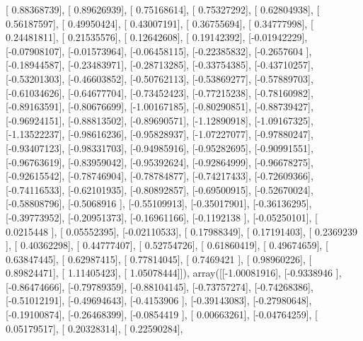 \documentclass{article}
\begin{document}
       [ 0.88368739],
       [ 0.89626939],
       [ 0.75168614],
       [ 0.75327292],
       [ 0.62804938],
       [ 0.56187597],
       [ 0.49950424],
       [ 0.43007191],
       [ 0.36755694],
       [ 0.34777998],
       [ 0.24481811],
       [ 0.21535576],
       [ 0.12642608],
       [ 0.19142392],
       [-0.01942229],
       [-0.07908107],
       [-0.01573964],
       [-0.06458115],
       [-0.22385832],
       [-0.2657604 ],
       [-0.18944587],
       [-0.23483971],
       [-0.28713285],
       [-0.33754385],
       [-0.43710257],
       [-0.53201303],
       [-0.46603852],
       [-0.50762113],
       [-0.53869277],
       [-0.57889703],
       [-0.61034626],
       [-0.64677704],
       [-0.73452423],
       [-0.77215238],
       [-0.78160982],
       [-0.89163591],
       [-0.80676699],
       [-1.00167185],
       [-0.80290851],
       [-0.88739427],
       [-0.96924151],
       [-0.88813502],
       [-0.89690571],
       [-1.12890918],
       [-1.09167325],
       [-1.13522237],
       [-0.98616236],
       [-0.95828937],
       [-1.07227077],
       [-0.97880247],
       [-0.93407123],
       [-0.98331703],
       [-0.94985916],
       [-0.95282695],
       [-0.90991551],
       [-0.96763619],
       [-0.83959042],
       [-0.95392624],
       [-0.92864999],
       [-0.96678275],
       [-0.92615542],
       [-0.78746904],
       [-0.78784877],
       [-0.74217433],
       [-0.72609366],
       [-0.74116533],
       [-0.62101935],
       [-0.80892857],
       [-0.69500915],
       [-0.52670024],
       [-0.58808796],
       [-0.5068916 ],
       [-0.55109913],
       [-0.35017901],
       [-0.36136295],
       [-0.39773952],
       [-0.20951373],
       [-0.16961166],
       [-0.1192138 ],
       [-0.05250101],
       [ 0.0215448 ],
       [ 0.05552395],
       [-0.02110533],
       [ 0.17988349],
       [ 0.17191403],
       [ 0.2369239 ],
       [ 0.40362298],
       [ 0.44777407],
       [ 0.52754726],
       [ 0.61860419],
       [ 0.49674659],
       [ 0.63847445],
       [ 0.62987415],
       [ 0.77814045],
       [ 0.7469421 ],
       [ 0.98960226],
       [ 0.89824471],
       [ 1.11405423],
       [ 1.05078444]]), array([[-1.00081916],
       [-0.9338946 ],
       [-0.86474666],
       [-0.79789359],
       [-0.88104145],
       [-0.73757274],
       [-0.74268386],
       [-0.51012191],
       [-0.49694643],
       [-0.4153906 ],
       [-0.39143083],
       [-0.27980648],
       [-0.19100874],
       [-0.26468399],
       [-0.0854419 ],
       [ 0.00663261],
       [-0.04764259],
       [ 0.05179517],
       [ 0.20328314],
       [ 0.22590284],
\end{document}
